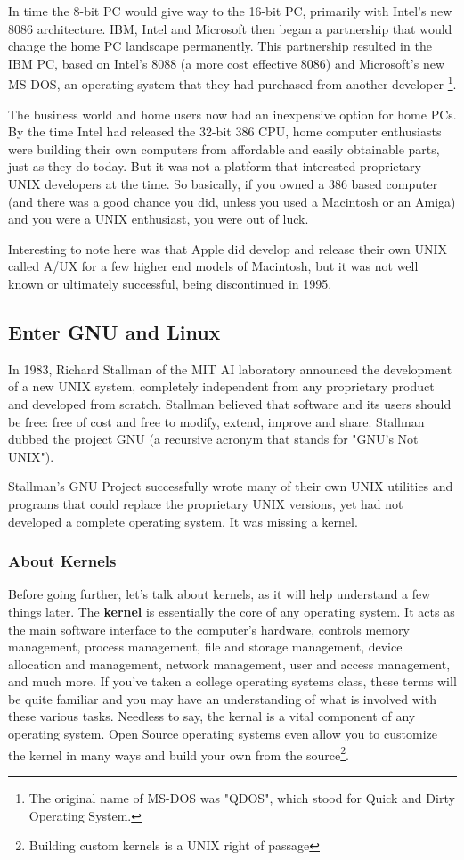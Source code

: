 In time the 8-bit PC would give way to the 16-bit PC, primarily with Intel's new 8086 architecture.  IBM, Intel and Microsoft then began a partnership that would change the home PC landscape permanently.  This partnership resulted in the IBM PC, based on Intel's 8088 (a more cost effective 8086) and Microsoft's new MS-DOS, an operating system that they had purchased from another developer \footnote{The original name of MS-DOS was "QDOS", which stood for Quick and Dirty Operating System.}.

The business world and home users now had an inexpensive option for home PCs. By the time Intel had released the 32-bit 386 CPU, home computer enthusiasts were building their own computers from affordable and easily obtainable parts, just as they do today. But it was not a platform that interested proprietary UNIX developers at the time.  So basically, if you owned a 386 based computer (and there was a good chance you did, unless you used a Macintosh or an Amiga) and you were a UNIX enthusiast, you were out of luck.

Interesting to note here was that Apple did develop and release their own UNIX called A/UX for a few higher end models of Macintosh, but it was not well known or ultimately successful, being discontinued in 1995.

\subsection{Enter GNU and Linux}

In 1983, Richard Stallman of the MIT AI laboratory announced the development of a new UNIX system, completely independent from any proprietary product and developed from scratch.  Stallman believed that software and its users should be free: free of cost and free to modify, extend, improve and share.  Stallman dubbed the project GNU (a recursive acronym that stands for "GNU's Not UNIX").

Stallman's GNU Project successfully wrote many of their own UNIX utilities and programs that could replace the proprietary UNIX versions, yet had not developed a complete operating system. It was missing a kernel. 

\subsubsection{About Kernels}

Before going further, let's talk about kernels, as it will help understand a few things later. The \textbf{kernel} is essentially the core of any operating system. It acts as the main software interface to the computer's hardware, controls memory management, process management, file and storage management, device allocation and management, network management, user and access management, and much more. If you've taken a college operating systems class, these terms will be quite familiar and you may have an understanding of what is involved with these various tasks. Needless to say, the kernal is a vital component of any operating system. Open Source operating systems even allow you to customize the kernel in many ways and build your own from the source\footnote{Building custom kernels is a UNIX right of passage}.

